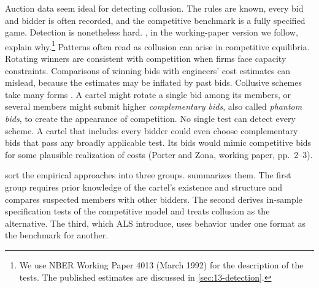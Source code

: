 Auction data seem ideal for detecting collusion. The rules are known, every bid and bidder is often
recorded, and the competitive benchmark is a fully specified game. Detection is nonetheless hard.
\citet{PorterZona1993}, in the working-paper version we follow, explain why.\footnote{We use NBER Working
Paper 4013 (March 1992) for the description of the tests. The published estimates are discussed in
\cref{sec:13-detection}.} Patterns often read as collusion can arise in competitive equilibria. Rotating
winners are consistent with competition when firms face capacity constraints. Comparisons of winning bids
with engineers' cost estimates can mislead, because the estimates may be inflated by past bids. Collusive
schemes take many forms \citep{HendricksPorter1989}. A cartel might rotate a single bid among its members,
or several members might submit higher \emph{complementary bids}, also called \emph{phantom bids}, to
create the appearance of competition. No single test can detect every scheme. A cartel that includes every
bidder could even choose complementary bids that pass any broadly applicable test. Its bids would mimic
competitive bids for some plausible realization of costs (Porter and Zona, working paper, pp.~2--3).

\citet[p.~211]{AtheyLevinSeira2011} sort the empirical approaches into three groups.
 summarizes them. The first group requires prior knowledge of the cartel's
existence and structure and compares suspected members with other bidders. The second derives in-sample
specification tests of the competitive model and treats collusion as the alternative. The third, which ALS
introduce, uses behavior under one format as the benchmark for another.

